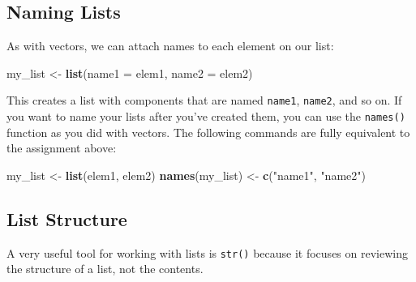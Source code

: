 \documentclass[]{book}
\newenvironment{Shaded}{\begin{snugshade}}{\end{snugshade}}
\newcommand{\KeywordTok}[1]{\textcolor[rgb]{0.13,0.29,0.53}{\textbf{#1}}}
\newcommand{\DataTypeTok}[1]{\textcolor[rgb]{0.13,0.29,0.53}{#1}}
\newcommand{\DecValTok}[1]{\textcolor[rgb]{0.00,0.00,0.81}{#1}}
\newcommand{\StringTok}[1]{\textcolor[rgb]{0.31,0.60,0.02}{#1}}
\newcommand{\CommentTok}[1]{\textcolor[rgb]{0.56,0.35,0.01}{\textit{#1}}}
\newcommand{\OperatorTok}[1]{\textcolor[rgb]{0.81,0.36,0.00}{\textbf{#1}}}
\newcommand{\NormalTok}[1]{#1}
\begin{document}
\subsection{Naming Lists}\label{naming-lists}

As with vectors, we can attach names to each element on our list:

\begin{Shaded}
\begin{Highlighting}[]
\NormalTok{my_list <-}\StringTok{ }\KeywordTok{list}\NormalTok{(}\DataTypeTok{name1 =}\NormalTok{ elem1, }
                \DataTypeTok{name2 =}\NormalTok{ elem2)}
\end{Highlighting}
\end{Shaded}

This creates a list with components that are named \texttt{name1},
\texttt{name2}, and so on. If you want to name your lists after you've
created them, you can use the \texttt{names()} function as you did with
vectors. The following commands are fully equivalent to the assignment
above:

\begin{Shaded}
\begin{Highlighting}[]
\NormalTok{my_list <-}\StringTok{ }\KeywordTok{list}\NormalTok{(elem1, elem2)}
\KeywordTok{names}\NormalTok{(my_list) <-}\StringTok{ }\KeywordTok{c}\NormalTok{(}\StringTok{"name1"}\NormalTok{, }\StringTok{"name2"}\NormalTok{)}
\end{Highlighting}
\end{Shaded}

\subsection{List Structure}\label{list-structure}

A very useful tool for working with lists is \texttt{str()} because it
focuses on reviewing the structure of a list, not the contents.

\begin{Shaded}
\end{Shaded}
\end{document}
